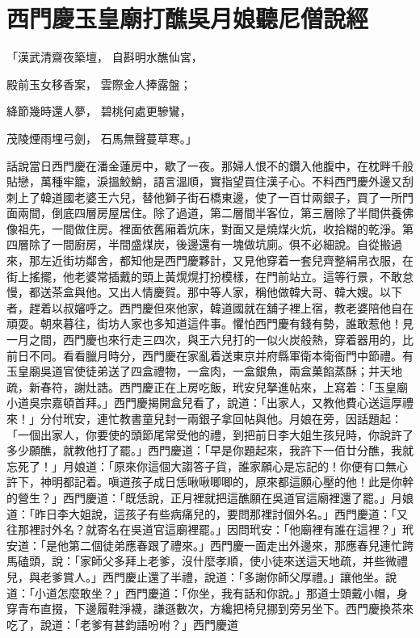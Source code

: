 %

\chapter{西門慶玉皇廟打醮\KG 吳月娘聽尼僧說經}


「漢武清齋夜築壇，  自斟明水醮仙宮，

殿前玉女移香案，  雲際金人捧露盤；

絳節幾時還人夢，  碧桃何處更驂鸞，

茂陵煙雨埋弓劍，  石馬無聲蔓草寒。」

話說當日西門慶在潘金蓮房中，歇了一夜。那婦人恨不的鑽入他腹中，在枕畔千般貼戀，萬種牢籠，淚搵鮫鮹，語言溫順，實指望買住漢子心。不料西門慶外邊又刮刺上了韓道國老婆王六兒，替他獅子街石橋東邊，使了一百廿兩銀子，買了一所門面兩間，倒底四層房屋居住。除了過道，第二層間半客位，第三層除了半間供養佛像祖先，一間做住房。裡面依舊廂着炕床，對面又是燒煤火炕，收拾糊的乾淨。第四層除了一間廚房，半間盛煤炭，後邊還有一塊做坑廁。俱不必細說。自從搬過來，那左近街坊鄰舍，都知他是西門慶夥計，又見他穿着一套兒齊整絹帛衣服，在街上搖擺，他老婆常插戴的頭上黃熀熀打扮模樣，在門前站立。這等行景，不敢怠慢，都送茶盒與他。又出人情慶賀。那中等人家，稱他做韓大哥、韓大嫂。以下者，趕着以叔嬸呼之。西門慶但來他家，韓道國就在舖子裡上宿，教老婆陪他自在頑耍。朝來暮往，街坊人家也多知道這件事。懼怕西門慶有錢有勢，誰敢惹他！見一月之間，西門慶也來行走三四次，與王六兒打的一似火炭般熱，穿着器用的，比前日不同。看看臘月時分，西門慶在家亂着送東京并府縣軍衛本衛衙門中節禮。有玉皇廟吳道官使徒弟送了四盒禮物，一盒肉，一盒銀魚，兩盒菓餡蒸酥；并天地疏，新春符，謝灶誥。西門慶正在上房吃飯，玳安兒拏進帖來，上寫着：「玉皇廟小道吳宗嘉頓首拜。」西門慶揭開盒兒看了，說道：「出家人，又教他費心送這厚禮來！」分付玳安，連忙教書童兒封一兩銀子拿回帖與他。月娘在旁，因話題起：「一個出家人，你要使的頭節尾常受他的禮，到把前日李大姐生孩兒時，你說許了多少願醮，就教他打了罷。」西門慶道：「早是你題起來，我許下一佰廿分醮，我就忘死了！」月娘道：「原來你這個大謅答子貨，誰家願心是忘記的！你便有口無心許下，神明都記着。嗔道孩子成日恁啾啾唧唧的，原來都這願心壓的他！此是你幹的營生？」西門慶道：「既恁說，正月裡就把這醮願在吳道官這廟裡還了罷。」月娘道：「昨日李大姐說，這孩子有些病痛兒的，要問那裡討個外名。」西門慶道：「又往那裡討外名？就寄名在吳道官這廟裡罷。」因問玳安：「他廟裡有誰在這裡？」玳安道：「是他第二個徒弟應春跟了禮來。」西門慶一面走出外邊來，那應春兒連忙跨馬磕頭，說：「家師父多拜上老爹，沒什麼孝順，使小徒來送這天地疏，并些微禮兒，與老爹賞人。」西門慶止還了半禮，說道：「多謝你師父厚禮。」讓他坐。說道：「小道怎麼敢坐？」西門慶道：「你坐，我有話和你說。」那道士頭戴小帽，身穿青布直掇，下邊履鞋淨襪，謙遜數次，方纔把椅兒挪到旁另坐下。西門慶換茶來吃了，說道：「老爹有甚鈞語吩咐？」西門慶道